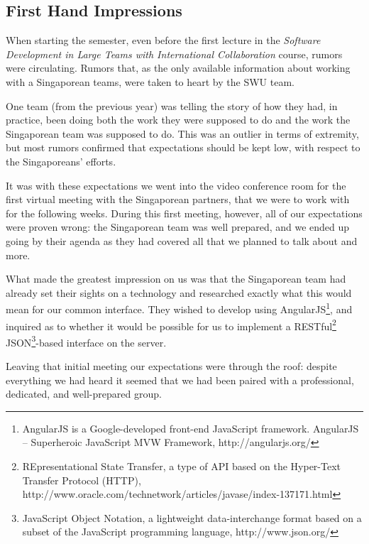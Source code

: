 \subsection{First Hand Impressions}
When starting the semester, even before the first lecture in the \emph{Software
Development in Large Teams with International Collaboration} course, rumors were
circulating. Rumors that, as the only available information about working with a
Singaporean teams, were taken to heart by the SWU team.

One team (from the previous year) was telling the story of how they had, in
practice, been doing both the work they were supposed to do and the work the
Singaporean team was supposed to do. This was an outlier in terms of extremity,
but most rumors confirmed that expectations should be kept low, with respect to
the Singaporeans' efforts.

It was with these expectations we went into the video conference room for the
first virtual meeting with the Singaporean partners, that we were to work with
for the following weeks. During this first meeting, however, all of our
expectations were proven wrong: the Singaporean team was well prepared, and we
ended up going by their agenda as they had covered all that we planned to talk
about and more.

What made the greatest impression on us was that the Singaporean team had
already set their sights on a technology and researched exactly what this would
mean for our common interface. They wished to develop using
AngularJS\footnote{AngularJS is a Google-developed front-end JavaScript
framework. AngularJS – Superheroic JavaScript MVW Framework,
http://angularjs.org/}, and inquired as to whether it would be possible for us
to implement a RESTful\footnote{REpresentational State Transfer, a type of API
based on the Hyper-Text Transfer Protocol (HTTP),
http://www.oracle.com/technetwork/articles/javase/index-137171.html}
JSON\footnote{ JavaScript Object Notation, a lightweight data-interchange format
based on a subset of the JavaScript programming language,
http://www.json.org/}-based interface on the server.

Leaving that initial meeting our expectations were through the roof: despite
everything we had heard it seemed that we had been paired with a professional,
dedicated, and well-prepared group.
